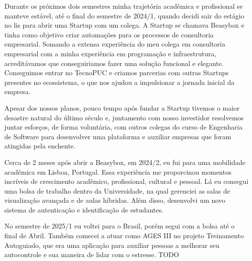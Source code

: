 Durante os próximos dois semestres minha trajetória acadêmica e profissional se manteve estável, até o final do semestre de 2024/1, quando decidi sair do estágio no \ac{lis} para abrir uma Startup com um colega. A Startup se chamava Beasybox e tinha como objetivo criar automações para os processos de consultoria empresarial. Somando a extensa experiência do meu colega em consultoria empresarial com a minha experiência em programação e infraestrutura, acreditávamos que conseguiriamos fazer uma solução funcional e elegante. Conseguimos entrar no TecnoPUC e criamos parcerias com outras Startups presentes no ecossistema, o que nos ajudou a impulsionar a jornada inicial da empresa.

Apesar dos nossos planos, pouco tempo após fundar a Startup tivemos o maior desastre natural do último século e, juntamento com nosso investidor resolvemos juntar esforços, de forma voluntária, com outros colegas do curso de Engenharia de Software para desenvolver uma plataforma e auxiliar empresas que foram atingidas pela enchente.

Cerca de 2 meses após abrir a Beasybox, em 2024/2, eu fui para uma mobilidade acadêmica em Lisboa, Portugal. Essa experiência me proporcinou momentos incríveis de crescimento acadêmico, profissional, cultural e pessoal. Lá eu consegui uma bolsa de trabalho dentro da Universidade, na qual gerenciei as salas de visualização avançada e de aulas híbridas. Além disso, desenvolvi um novo sistema de autenticação e identificação de estudantes.

No semestre de 2025/1 eu voltei para o Brasil, porém segui com a bolsa até o final de Abril. Também comecei a atuar como AGES III no projeto Treinamento Autoguiado, que era uma aplicação para auxiliar pessoas a melhorar seu autocontrole e sua maneira de lidar com o estresse.
TODO